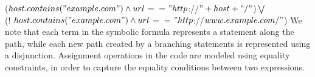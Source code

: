 \scriptsize
($host.contains("example.com") \wedge url$$==$$"http$://$"+host+"/"$)$\bigvee$ \\
(! $host.contains("example.com") \wedge url$$==$$"http$://$www.example.com/"$)
\normalsize
We note that each term in the symbolic formula represents a statement along the path, while each new path created by a branching statements is represented using a disjunction. Assignment operations in the code are modeled using equality constraints, in order to capture the equality conditions between two expressions. 




